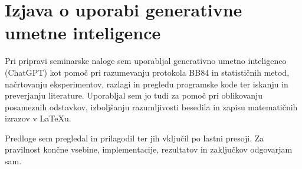 \section*{Izjava o uporabi generativne umetne inteligence}
Pri pripravi seminarske naloge sem uporabljal generativno umetno inteligenco (ChatGPT) kot pomoč pri razumevanju protokola BB84 in statističnih metod, načrtovanju eksperimentov, razlagi in pregledu programske kode ter iskanju in preverjanju literature. Uporabljal sem jo tudi za pomoč pri oblikovanju posameznih odstavkov, izboljšanju razumljivosti besedila in zapisu matematičnih izrazov v LaTeXu.

Predloge sem pregledal in prilagodil ter jih vključil po lastni presoji. Za pravilnost končne vsebine, implementacije, rezultatov in zaključkov odgovarjam sam.